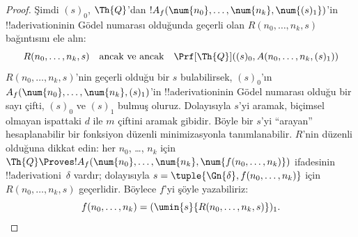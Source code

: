 \documentclass[../../../include/open-logic-section]{subfiles}
\begin{document}
\begin{proof}
Şimdi $(s)_0$, $\Th{Q}$'dan
$!A_f(\num{n_0}, \dots, \num{n_k}, \num{(s)_1})$'in !!a{derivation}{}inin
Gödel numarası olduğunda geçerli olan $R(n_0,\dots,n_k,s)$ bağıntısını
ele alın:
\[
R(n_0, \dots, n_k, s) \quad\text{ancak ve ancak}\quad \Prf[\Th{Q}]((s)_0, A(n_0,
\dots, n_k, (s)_1))
\]
$R(n_0,\dots,n_k,s)$'nin geçerli olduğu bir $s$ bulabilirsek,
$(s)_0$'ın $A_f(\num{n_0}, \dots, \num{n_k}, (s)_1)$'in
!!a{derivation}{}inin Gödel numarası olduğu bir sayı çifti, $(s)_0$ ve
$(s)_1$ bulmuş oluruz. Dolayısıyla $s$'yi aramak, biçimsel olmayan ispattaki
$d$ ile $m$ çiftini aramak gibidir. Böyle bir $s$'yi ``arayan'' hesaplanabilir
bir fonksiyon düzenli minimizasyonla tanımlanabilir. $R$'nin düzenli olduğuna
dikkat edin: her $n_0$, \dots, $n_k$ için
$\Th{Q} \Proves !A_f(\num{n_0}, \dots, \num{n_k},
\num{f(n_0, \dots, n_k)})$ ifadesinin !!a{derivation}{}i~$\delta$ vardır;
dolayısıyla $s=\tuple{\Gn{\delta},f(n_0,\dots,n_k)}$ için
$R(n_0,\dots,n_k,s)$ geçerlidir. Böylece $f$'yi şöyle yazabiliriz:
\[
f(n_0,\dots,n_{k}) = (\umin{s}{R(n_0, \dots, n_k, s)})_1.
\]
\end{proof}
\end{document}
